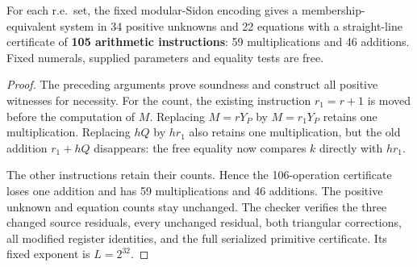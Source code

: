 \begin{theorem}\label{thm:best105}
For each r.e.\ set, the fixed modular-Sidon encoding gives a
membership-equivalent system in 34 positive unknowns and 22 equations
with a straight-line certificate of \textbf{105 arithmetic instructions}:
59 multiplications and 46 additions. Fixed numerals, supplied parameters
and equality tests are free.
\end{theorem}
\begin{proof}
The preceding arguments prove soundness and construct all positive
witnesses for necessity. For the count, the existing instruction
$r_1=r+1$ is moved before the computation of $M$. Replacing
$M=rY_P$ by $M=r_1Y_P$ retains one multiplication. Replacing $hQ$
by $hr_1$ also retains one multiplication, but the old addition
$r_1+hQ$ disappears: the free equality now compares $k$ directly
with $hr_1$.

The other instructions retain their counts. Hence the 106-operation
certificate loses one addition and has 59 multiplications and 46
additions. The positive unknown and equation counts stay unchanged.
The checker 
verifies the three changed source residuals, every unchanged residual,
both triangular corrections, all modified register identities, and
the full serialized primitive certificate. Its fixed exponent is
$L=2^{32}$.
\end{proof}
